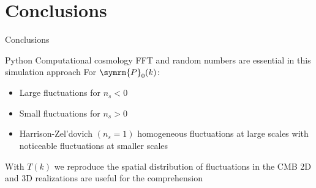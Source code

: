 \section{Conclusions}
\begin{frame}[noframenumbering]{Conclusions}
    \begin{itemize}
        \thusitem Python  Computational cosmology
        \thusitem FFT and random numbers are essential in this simulation approach
        \thusitem For \(\symrm{P}_0(k)\):
        \begin{itemize}[label=\filledcircle]
            \item Large fluctuations for \(n_s<0\)
            \item Small fluctuations for \(n_s>0\)
            \item Harrison-Zel'dovich \((n_s=1)\) homogeneous fluctuations at large scales with noticeable fluctuations at smaller scales
        \end{itemize}
        \thusitem With \(T(k)\) we reproduce the spatial distribution of fluctuations in the CMB
        \thusitem 2D and 3D realizations are useful for the comprehension
    \end{itemize}
\end{frame}